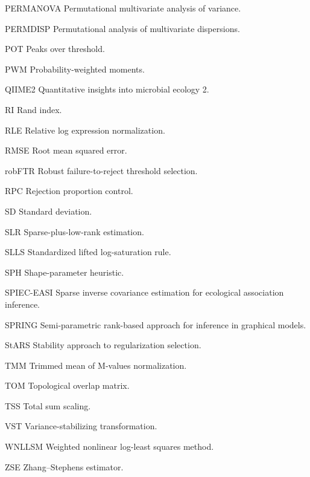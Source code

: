 \begin{notationlist}
	\item[PERMANOVA] Permutational multivariate analysis of variance.
	
	\item[PERMDISP] Permutational analysis of multivariate dispersions.
	
	\item[POT] Peaks over threshold.
	
	\item[PWM] Probability-weighted moments.
	
	\item[QIIME2] Quantitative insights into microbial ecology 2.
	
	\item[RI] Rand index.
	
	\item[RLE] Relative log expression normalization.
	
	\item[RMSE] Root mean squared error.
	
	\item[robFTR] Robust failure-to-reject threshold selection.
	
	\item[RPC] Rejection proportion control.
	
	\item[SD] Standard deviation.
	
	\item[SLR] Sparse-plus-low-rank estimation.
	
	\item[SLLS] Standardized lifted log-saturation rule.
	
	\item[SPH] Shape-parameter heuristic.
	
	\item[SPIEC-EASI] Sparse inverse covariance estimation for ecological association inference.
	
	\item[SPRING] Semi-parametric rank-based approach for inference in graphical models.
	
	\item[StARS] Stability approach to regularization selection.
	
	\item[TMM] Trimmed mean of M-values normalization.
	
	\item[TOM] Topological overlap matrix.
	
	\item[TSS] Total sum scaling.
	
	\item[VST] Variance-stabilizing transformation.
	
	\item[WNLLSM] Weighted nonlinear log-least squares method.
	
	\item[ZSE] Zhang--Stephens estimator.
	
\end{notationlist}
